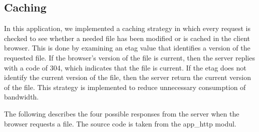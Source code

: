 \subsection{Caching}
In this application, we implemented a caching strategy in which every request is checked to see whether a needed file has been modified or is cached in the client browser. This is done by examining an etag value that identifies a version of the requested file.  If the browser's version of the file is current, then the server replies with a code of 304, which indicates that the file is current.  If the etag does not identify the current version of the file, then the server return the current version of the file. This strategy is implemented to reduce unnecessary consumption of bandwidth.

The following describes the four possible responses from the server when the browser requests a file.  The source code is taken from the app{\_}http modul. 

